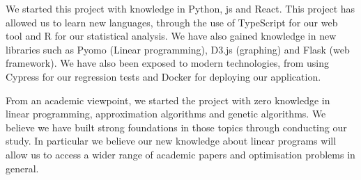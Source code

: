 We started this project with knowledge in Python, \acrshort{js} and React. This project has allowed us to learn new languages, through the use of TypeScript for our web tool and R for our statistical analysis. We have also gained knowledge in new libraries such as Pyomo (Linear programming), D3.js (graphing) and Flask (web framework). We have also been exposed to modern technologies, from using Cypress for our regression tests and Docker for deploying our application.

From an academic viewpoint, we started the project with zero knowledge in linear programming, approximation algorithms and genetic algorithms. We believe we have built strong foundations in those topics through conducting our study. In particular we believe our new knowledge about linear programs will allow us to access a wider range of academic papers and optimisation problems in general.